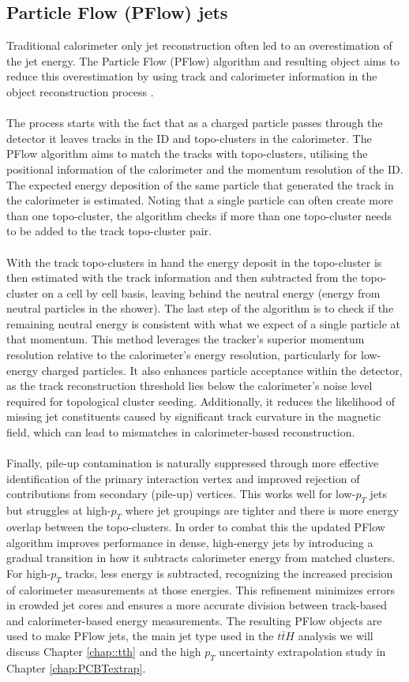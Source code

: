 \subsection{Particle Flow (PFlow) jets}
Traditional calorimeter only jet reconstruction often led to an overestimation of the jet energy. The Particle Flow (PFlow) algorithm and resulting object aims to reduce this overestimation by using track and calorimeter information in the object reconstruction process \cite{pflow}.
\\
\\
The process starts with the fact that as a charged particle passes through the detector it leaves tracks in the ID and topo-clusters in the calorimeter. The PFlow algorithm aims to match the tracks with topo-clusters, utilising the positional information of the calorimeter and the momentum resolution of the ID. The expected energy deposition of the same particle that generated the track in the calorimeter is estimated. Noting that a single particle can often create more than one topo-cluster, the algorithm checks if more than one topo-cluster needs to be added to the track topo-cluster pair. 
\\
\\
With the track topo-clusters in hand the energy deposit in the topo-cluster is then estimated with the track information and then subtracted from the topo-cluster on a cell by cell basis, leaving behind the neutral energy (energy from neutral particles in the shower). The last step of the algorithm is to check if the remaining neutral energy is consistent with what we expect of a single particle at that momentum. This method leverages the tracker’s superior momentum resolution relative to the calorimeter’s energy resolution, particularly for low-energy charged particles. It also enhances particle acceptance within the detector, as the track reconstruction threshold lies below the calorimeter’s noise level required for topological cluster seeding. Additionally, it reduces the likelihood of missing jet constituents caused by significant track curvature in the magnetic field, which can lead to mismatches in calorimeter-based reconstruction.
\\
\\
Finally, pile-up contamination is naturally suppressed through more effective identification of the primary interaction vertex and improved rejection of contributions from secondary (pile-up) vertices. This works well for low-$p_T$ jets but struggles at high-$p_T$ where jet groupings are tighter and there is more energy overlap between the topo-clusters. In order to combat this the updated PFlow algorithm improves performance in dense, high-energy jets by introducing a gradual transition in how it subtracts calorimeter energy from matched clusters. For high-$p_T$ tracks, less energy is subtracted, recognizing the increased precision of calorimeter measurements at those energies. This refinement minimizes errors in crowded jet cores and ensures a more accurate division between track-based and calorimeter-based energy measurements. The resulting PFlow objects are used to make PFlow jets, the main jet type used in the $t\bar{t}H$ analysis we will discuss Chapter \ref{chap::tth} and the high $p_T$ uncertainty extrapolation study in Chapter \ref{chap:PCBTextrap}. 
